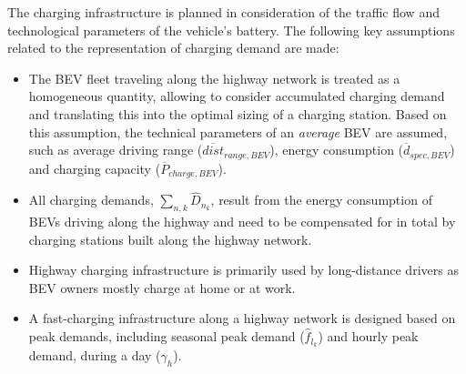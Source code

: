             The charging infrastructure is planned in consideration of the traffic flow and technological parameters of the vehicle's battery. The following key assumptions related to the representation of charging demand are made:
            \begin{itemize}
            \item The \ac{BEV} fleet traveling along the highway network is treated as a homogeneous quantity, allowing to consider accumulated charging demand and translating this into the optimal sizing of a charging station. Based on this assumption, the technical parameters of an \textit{average} \ac{BEV} are assumed, such as average driving range ($\overline{dist}_{range, BEV}$), energy consumption ($\overline{d}_{spec, BEV}$) and charging capacity ($\overline{P}_{charge,BEV}$).
            \item All charging demands, $\sum_{n, k}\hat{D}_{n_k}$, result from the energy consumption of \acp{BEV} driving along the highway and need to be compensated for in total by charging stations built along the highway network.
            \item Highway charging infrastructure is primarily used by long-distance drivers as \ac{BEV} owners mostly charge at home or at work.
            \item A fast-charging infrastructure along a highway network is designed based on peak demands, including seasonal peak demand ($\hat{f}_{l_k}$) and hourly peak demand, during a day ($\gamma_h$).
            \end{itemize}






